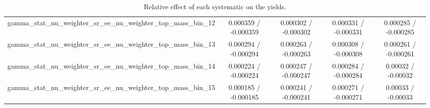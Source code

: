 \documentclass[10pt]{article}
\begin{document}
\begin{table}[htbp]
\begin{center}
\begin{tabular}{|c|c|c|c|c|}
  gamma_stat_nu_weighter_sr_ee_nu_weighter_top_mass_bin_12 & 0.000359 / -0.000359 & 0.000302 / -0.000302 & 0.000331 / -0.000331 & 0.000285 / -0.000285 \\ 
  gamma_stat_nu_weighter_sr_ee_nu_weighter_top_mass_bin_13 & 0.000294 / -0.000294 & 0.000263 / -0.000263 & 0.000308 / -0.000308 & 0.000261 / -0.000261 \\ 
  gamma_stat_nu_weighter_sr_ee_nu_weighter_top_mass_bin_14 & 0.000224 / -0.000224 & 0.000247 / -0.000247 & 0.000284 / -0.000284 & 0.00032 / -0.00032 \\ 
  gamma_stat_nu_weighter_sr_ee_nu_weighter_top_mass_bin_15 & 0.000185 / -0.000185 & 0.000241 / -0.000241 & 0.000271 / -0.000271 & 0.00033 / -0.00033 \\ 
\hline 
\end{tabular} 
\caption{Relative effect of each systematic on the yields.} 
\end{center} 
\end{table} 
\end{document}
